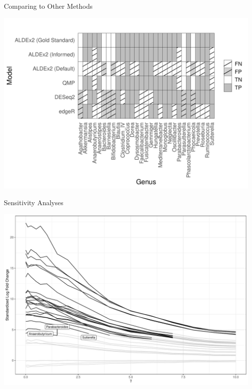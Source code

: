 \documentclass[
  ignorenonframetext,
]{beamer}
\begin{document}
\begin{frame}{Comparing to Other Methods}
\protect\hypertarget{comparing-to-other-methods}{}
\begin{center}\includegraphics[width=0.95\linewidth]{slides_files/figure-beamer/unnamed-chunk-17-1} \end{center}
\end{frame}

\begin{frame}{Sensitivity Analyses}
\protect\hypertarget{sensitivity-analyses-3}{}
\begin{center}\includegraphics[width=0.95\linewidth]{slides_files/figure-beamer/unnamed-chunk-18-1} \end{center}
\end{frame}
\end{document}
